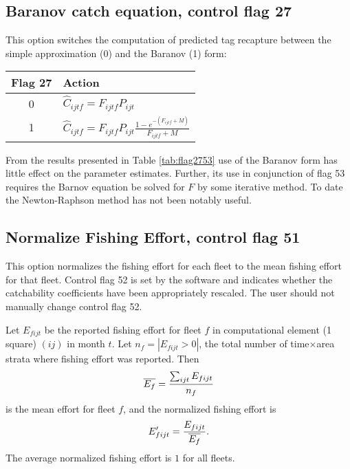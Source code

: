 \subsection*{Baranov catch equation, control flag 27}
This option switches the computation of predicted tag recapture
between the simple approximation (0) and the Baranov (1) form:
\begin{center}
\renewcommand{\baselinestretch}{1.5} \small\normalsize
\begin{tabular}{cp{4.0in}}
\hline
Flag 27 & Action\\
\hline
 0 & $\widehat{C}_{ijtf} = F_{ijtf} P_{ijt}$\\
 1 & $\widehat{C}_{ijtf} = F_{ijtf} P_{ijt}\frac{1-e^{-(F_{ijtf}+M)}}{F_{ijtf}+M}$\\
\hline
\end{tabular}
\renewcommand{\baselinestretch}{1.0} \small\normalsize
\end{center}

From the results presented in Table \ref{tab:flag2753} use of the
Baranov form has little effect on the parameter estimates. Further,
its use in conjunction of flag 53 requires the Barnov equation be
solved for $F$ by some iterative method. To date the
Newton-Raphson method has not been notably useful.

\subsection*{Normalize Fishing Effort, control flag 51}
This option normalizes the fishing effort for each fleet to the mean
fishing effort for that fleet. Control flag 52 is set by the software
and indicates whether the
catchability coefficients have been appropriately rescaled. The user
should not manually change control flag 52.

Let $E_{fijt}$ be the reported
fishing effort for fleet $f$ in computational element (1\deg{} square)
$(ij)$ in month $t$. Let $n_f = |E_{fijt}>0|$, the total number of
time$\times$area strata where fishing effort was
reported. Then
\begin{equation}
\overline{E_f} = \frac{\sum_{ijt}E_{fijt}}{n_f}
\end{equation}
is the mean effort for fleet $f$, 
and the normalized fishing effort is 
\begin{equation}
E^{\prime}_{fijt} = \frac{E_{fijt}}{\overline{E_f}}.
\end{equation}
The average normalized fishing effort is $1$ for all fleets.

